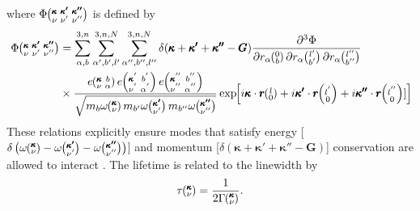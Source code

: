 %
where $\Phi\mspace{-4.0mu}\left(\mspace{-8.0mu} \begin{smallmatrix}&\pmb{\kappa}&\pmb{\kappa'}&\pmb{\kappa''} \\&\nu&\nu'&\nu''\end{smallmatrix} \mspace{-3.0mu}\right)$ is defined by
%
\begin{equation}\label{EQ:Phi_anh}
\begin{split}
\Phi\kvkvpkvpp&=\sum_{\alpha,b}^{3,n}\sum_{\alpha',b',l'}^{3,n,N}\sum_{\alpha'',b'',l''}^{3,n,N}\delta(\pmb{\kappa}+\pmb{\kappa'}+\pmb{\kappa''}-\pmb{G})\frac{\partial^3\Phi}{\partial r_\alpha \Ob \partial r_\alpha \lbp \partial r_\alpha \lbpp}\\
&\times \frac{e \kvba e \kvbain{'}e \kvbain{''}}{\sqrt{m_{b}\omega\kv
m_{b'}\omega\kvp m_{b''}\omega\kvpp}}\EXP{i\pmb{\kappa}\cdot \pmb{r}\lO+i\pmb{\kappa'}\cdot \pmb{r}\lOin{'}+i\pmb{\kappa''}\cdot \pmb{r}\lOin{''}]}
\end{split}
\end{equation}
%
These relations explicitly ensure modes that satisfy energy [$\delta\left(\omega\kv-\omega\kvp-\omega\kvpp\right)$] and momentum [$\delta(\pmb{\kappa}+\pmb{\kappa'}+\pmb{\kappa''}-\pmb{G})$] conservation are allowed to interact \cite{srivastava1990physics}. The lifetime is related to the linewidth by
%
\begin{equation}\label{EQ:lifetime}
\tau \mspace{-4.0mu}\left(\mspace{-8.0mu} \begin{smallmatrix}&\pmb{\kappa} \\&\nu\end{smallmatrix} \mspace{-3.0mu}\right)=\frac{1}{2\Gamma\mspace{-4.0mu}\left(\mspace{-8.0mu} \begin{smallmatrix}&\pmb{\kappa} \\&\nu\end{smallmatrix} \mspace{-3.0mu}\right)}.
\end{equation}
%

\begin{comment}
The interpretation of this relation can be understood through a qualitative argument from time-dependent perturbation theory (TDPT). Using TDPT, the anharmonic terms in the complete Hamiltonian are assumed to be small and can thus be considered to be to perturbation upon the harmonic state. The probability amplitude carries the time-dependence in this picture. In a two-state system
%
\begin{equation}
|\Psi\rangle=A(t)|\psi_A\rangle+B(t)|\psi_B\rangle
\end{equation}
%
as the amplitudes $A(t)$ and $B(t)$ vary time, so does the probability of finding the particle in state $|\psi_A>$ or $|\psi_B>$. Expressing the equivalent relation for three-phonon processes
%
\begin{equation}\label{EQ:threephonon}
|\bm{\kappa},\bm{\kappa}',\bm{\kappa}''\rangle=A(t)|\bm{\kappa}\rangle+B(t)|\bm{\kappa}'\rangle+C(t)|\bm{\kappa}''\rangle.
\end{equation}
%
The probability of a phonon scattering from $\bm{\kappa}$ to state $\bm{\kappa}'$ is governed by the relative magnitudes of the amplitudes $A(t)$ and $B(t)$ (in accordance with the selection rules of momentum and energy conservation). The broadening of these peaks corresponds to this scattering process, indicating a non-zero probability of a phonon transitioning from one state to another. The form of Eq.~\ref{EQ:threephonon} is a consequence of Fermi's Golden Rule from TDPT.
\end{comment}

